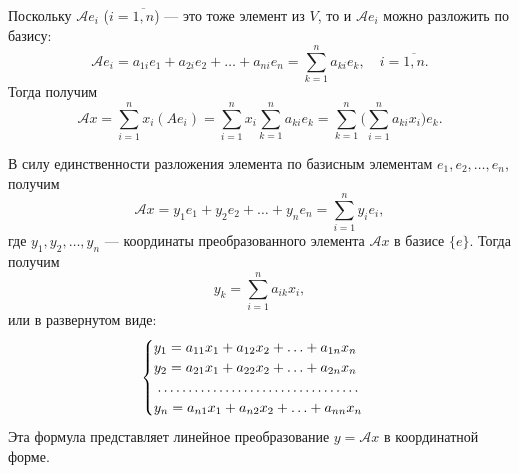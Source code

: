 \documentclass[a5paper, 11pt]{extbook}
\theoremstyle{definition}
\theoremstyle{definition}
\theoremstyle{definition}
\begin{document}
Поскольку \(\mathcal{A} e_i\) (\(i = \overline{1,n}\)) — это тоже элемент из \(V\), то и \(\mathcal{A} e_i\) можно разложить по базису:
\[
    \mathcal{A} e_i =
    a_{1i} e_1 + a_{2i} e_2 + \ldots + a_{ni} e_n =
    \sum_{k = 1}^n a_{ki} e_k, \quad i = \overline{1, n}.
\]
Тогда получим
\[
    \mathcal{A} x =
    \sum_{i = 1}^n x_i (A e_i) =
    \sum_{i = 1}^ n x_i \sum_{k = 1}^n a_{ki} e_k =
    \sum_{k = 1}^ n \Big( \sum_{i = 1}^n a_{ki} x_i \Big) e_k.
\]

В силу единственности разложения элемента по базисным элементам \(e_1, e_2, \ldots, e_n\), получим
\[
    \mathcal{A} x =
    y_1 e_1 + y_2 e_2 + \ldots + y_n e_n =
    \sum_{i = 1}^n y_i e_i,
\]
где \(y_1, y_2, \ldots, y_n\) — координаты преобразованного элемента \(\mathcal{A} x\) в базисе \(\{e\}\). Тогда получим
\[
    y_k = \sum_{i = 1}^n a_{ik} x_i,
\]
или в развернутом виде:
\[
    \begin{cases}
        y_1 = a_{11} x_1 + a_{12} x_2 + \ldots + a_{1n} x_n \\
        y_2 = a_{21} x_1 + a_{22} x_2 + \ldots + a_{2n} x_n \\
        \dotfill                                            \\
        y_n = a_{n1} x_1 + a_{n2} x_2 + \ldots + a_{nn} x_n \\
    \end{cases}
\]
Эта формула представляет линейное преобразование \(y = \mathcal{A} x\) в координатной форме.
\end{document}

